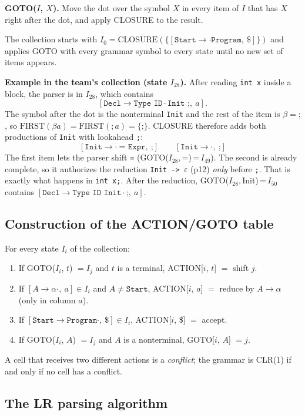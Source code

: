 \documentclass[11pt,letterpaper]{article}
\let\oldsubsection\subsection
\renewcommand{\subsection}{\needspace{6\baselineskip}\oldsubsection}
\newcommand{\tok}[1]{\texttt{#1}}
\begin{document}
\textbf{GOTO($I$, $X$).} Move the dot over the symbol $X$ in every item of
$I$ that has $X$ right after the dot, and apply CLOSURE to the result.

The collection starts with $I_0=\text{CLOSURE}(\{[\texttt{Start}\to\cdot\texttt{Program},\ \$]\})$
and applies GOTO with every grammar symbol to every state until no new set of
items appears.

\textbf{Example in the team's collection (state $I_{28}$).} After reading
\texttt{int x} inside a block, the parser is in $I_{28}$, which contains
\[
[\texttt{Decl}\to\texttt{Type ID}\cdot\texttt{Init ;},\ a].
\]
The symbol after the dot is the nonterminal \texttt{Init} and the rest of the
item is $\beta=\texttt{;}$, so $\text{FIRST}(\beta a)=\text{FIRST}(\texttt{;}\,a)=\{\texttt{;}\}$.
CLOSURE therefore adds both productions of \texttt{Init} with lookahead
\texttt{;}:
\[
[\texttt{Init}\to\cdot\ \texttt{= Expr},\ \texttt{;}]\qquad
[\texttt{Init}\to\cdot,\ \texttt{;}]
\]
The first item lets the parser shift \tok{=} (GOTO($I_{28}$,\,=)\,=\,$I_{49}$).
The second is already complete, so it authorizes the reduction
\texttt{Init -> $\varepsilon$} (p12) \emph{only} before \tok{;}. That is
exactly what happens in \texttt{int x;}. After the reduction,
GOTO($I_{28}$,\,Init)\,=\,$I_{50}$ contains
$[\texttt{Decl}\to\texttt{Type ID Init}\cdot\texttt{;},\ a]$.

\subsection{Construction of the ACTION/GOTO table}

For every state $I_i$ of the collection:
\begin{enumerate}
  \item If GOTO($I_i$, $t$) $=I_j$ and $t$ is a terminal, ACTION[$i$, $t$] $=$ shift $j$.
  \item If $[A\to\alpha\cdot,\ a]\in I_i$ and $A\ne\texttt{Start}$,
        ACTION[$i$, $a$] $=$ reduce by $A\to\alpha$ (only in column $a$).
  \item If $[\texttt{Start}\to\texttt{Program}\cdot,\ \$]\in I_i$,
        ACTION[$i$, \$] $=$ accept.
  \item If GOTO($I_i$, $A$) $=I_j$ and $A$ is a nonterminal, GOTO[$i$, $A$] $=j$.
\end{enumerate}
A cell that receives two different actions is a \emph{conflict}; the grammar is
CLR(1) if and only if no cell has a conflict.

\subsection{The LR parsing algorithm}
\end{document}
